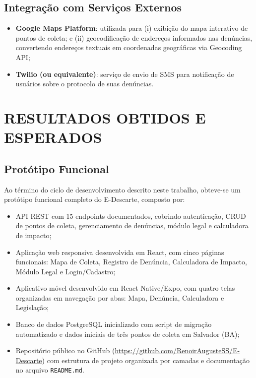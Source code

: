 \documentclass[12pt, a4paper]{article}
\numberwithin{equation}{section}
\numberwithin{figure}{section}
\numberwithin{table}{section}
\begin{document}
\subsection{Integração com Serviços Externos}

\begin{itemize}
  \item \textbf{Google Maps Platform}: utilizada para (i) exibição do
        mapa interativo de pontos de coleta; e (ii) geocodificação de
        endereços informados nas denúncias, convertendo endereços textuais
        em coordenadas geográficas via Geocoding API;
  \item \textbf{Twilio (ou equivalente)}: serviço de envio de SMS para
        notificação de usuários sobre o protocolo de suas denúncias.
\end{itemize}

\section{RESULTADOS OBTIDOS E ESPERADOS}

\subsection{Protótipo Funcional}

Ao término do ciclo de desenvolvimento descrito neste trabalho, obteve-se um
protótipo funcional completo do E-Descarte, composto por:

\begin{itemize}
  \item API REST com 15 endpoints documentados, cobrindo autenticação, CRUD
        de pontos de coleta, gerenciamento de denúncias, módulo legal e
        calculadora de impacto;
  \item Aplicação web responsiva desenvolvida em React, com cinco páginas
        funcionais: Mapa de Coleta, Registro de Denúncia, Calculadora de
        Impacto, Módulo Legal e Login/Cadastro;
  \item Aplicativo móvel desenvolvido em React Native/Expo, com quatro telas
        organizadas em navegação por abas: Mapa, Denúncia, Calculadora e
        Legislação;
  \item Banco de dados PostgreSQL inicializado com script de migração
        automatizado e dados iniciais de três pontos de coleta em Salvador (BA);
  \item Repositório público no GitHub
        (\url{https://github.com/RenoirAugusteSS/E-Descarte}) com
        estrutura de projeto organizada por camadas e documentação no
        arquivo \texttt{README.md}.
\end{itemize}
\end{document}
